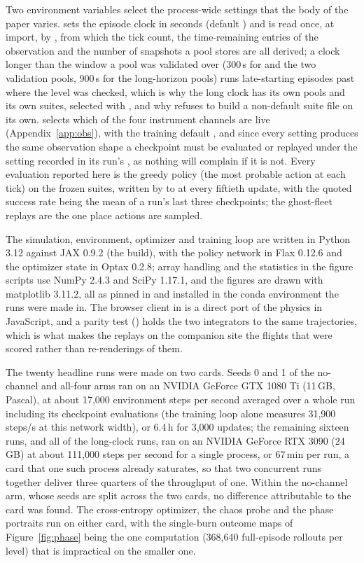 Two environment variables select the process-wide settings that the body of
the paper varies.  sets the episode clock in
seconds (default ) and is read once, at import, by
, from which the tick count, the time-remaining
entries of the observation and the number of snapshots a pool stores are all
derived; a clock longer than the window a pool was validated over (300\,s for
 and the two validation pools, 900\,s for the long-horizon pools)
runs late-starting episodes past where the level was checked, which is why the
long clock has its own pools and its own suites, selected with
, and why  refuses to build a
non-default suite file on its own.  selects which
of the four instrument channels are live (Appendix~\ref{app:obs}), with the
training default , and since every setting produces the same
observation shape a checkpoint must be evaluated or replayed under the setting
recorded in its run's , as nothing will complain if it is
not. Every evaluation reported here is the greedy policy (the most probable
action at each tick) on the frozen suites, written by  to
 at every fiftieth update, with the quoted success rate being
the mean of a run's last three checkpoints; the ghost-fleet replays are the
one place actions are sampled.

The simulation, environment, optimizer and training loop are written in
Python 3.12 against JAX 0.9.2 (the  build), with the policy
network in Flax 0.12.6 and the optimizer state in Optax 0.2.8; array handling
and the statistics in the figure scripts use NumPy 2.4.3 and SciPy 1.17.1, and
the figures are drawn with matplotlib 3.11.2, all as pinned in
 and installed in the conda environment the runs
were made in. The browser client in  is a direct port of the
physics in JavaScript, and a parity test ()
holds the two integrators to the same trajectories, which is what makes the
replays on the companion site the flights that were scored rather than
re-renderings of them.

The twenty headline runs were made on two cards. Seeds 0 and 1 of the
no-channel and all-four arms ran on an NVIDIA GeForce GTX 1080 Ti (11\,GB,
Pascal), at about 17,000 environment steps per second averaged over a whole
run including its checkpoint evaluations (the training loop alone measures
31,900 steps/s at this network width), or 6.4\,h for 3,000 updates; the
remaining sixteen runs, and all of the long-clock runs, ran on an NVIDIA
GeForce RTX 3090 (24\,GB) at about 111,000 steps per second for a single
process, or 67\,min per run, a card that one such process already saturates,
so that two concurrent runs together deliver three quarters of the throughput
of one. Within the no-channel arm, whose seeds are split across the two cards, no
difference attributable to the card was found. The cross-entropy optimizer, the chaos probe and the phase portraits run
on either card, with the single-burn outcome maps of Figure~\ref{fig:phase}
being the one computation (368,640 full-episode rollouts per level) that is
impractical on the smaller one.

